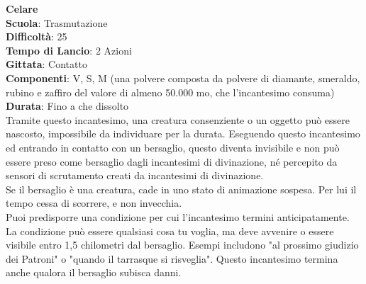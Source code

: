 \begin{multicols}{2}
\medskip\textbf{Celare}\\
\textbf{Scuola}: Trasmutazione\\
\textbf{Difficoltà}: 25\\
\textbf{Tempo di Lancio}: 2 Azioni\\
\textbf{Gittata}: Contatto\\
\textbf{Componenti}: V, S, M (una polvere composta da polvere di diamante, smeraldo, rubino e zaffiro del valore di almeno 50.000 mo, che l'incantesimo consuma)\\
\textbf{Durata}: Fino a che dissolto \\
Tramite questo incantesimo, una creatura consenziente o un oggetto può essere nascosto, impossibile da individuare per la durata. Eseguendo questo incantesimo ed entrando in contatto con un bersaglio, questo diventa invisibile e non può essere preso come bersaglio dagli incantesimi di divinazione, né percepito da sensori di scrutamento creati da incantesimi di divinazione.\\
Se il bersaglio è una creatura, cade in uno stato di animazione sospesa. Per lui il tempo cessa di scorrere, e non invecchia. \\
Puoi predisporre una condizione per cui l'incantesimo termini anticipatamente. La condizione può essere qualsiasi cosa tu voglia, ma deve avvenire o essere visibile entro 1,5 chilometri dal bersaglio. Esempi includono "al prossimo giudizio dei Patroni" o "quando il tarrasque si risveglia". Questo incantesimo termina anche qualora il bersaglio subisca danni.



\end{multicols}
